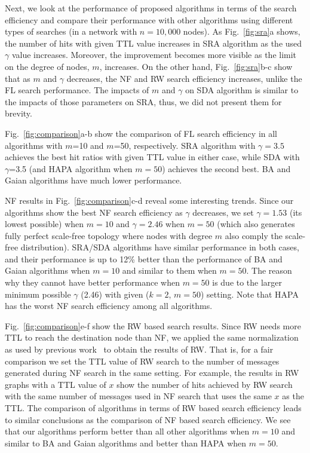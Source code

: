 \documentclass[10pt,journal,cspaper,compsoc]{IEEEtran}
\begin{document}
Next, we look at the performance of proposed algorithms in terms of the search efficiency and compare their performance with other algorithms using different types of searches (in a network with $n=10,000$ nodes). As Fig.~\ref{fig:sra}a shows, the number of hits with given TTL value increases in SRA algorithm as the used $\gamma$ value increases. Moreover, the improvement becomes more visible as the limit on the degree of nodes, $m$, increases. On the other hand, Fig.~\ref{fig:sra}b-c show that as $m$ and $\gamma$ decreases, the NF and RW search efficiency increases, unlike the FL search performance. The impacts of $m$ and $\gamma$ on SDA algorithm is similar to the impacts of those parameters on SRA, thus, we did not present them for brevity. 

Fig.~\ref{fig:comparison}a-b show the comparison of FL search efficiency in all algorithms with $m$=10 and $m$=50, respectively. SRA algorithm with $\gamma =3.5$ achieves the best hit ratios with given TTL value in either case, while SDA with $\gamma$=3.5 (and HAPA algorithm when $m=50$) achieves the second best. BA and Gaian algorithms have much lower performance. 



NF results in Fig.~\ref{fig:comparison}c-d reveal some interesting trends. Since our algorithms show the best NF search efficiency as $\gamma$ decreases, we set $\gamma=1.53$ (its lowest possible) when $m=10$ and $\gamma=2.46$ when $m=50$ (which also generates fully perfect scale-free topology where nodes with degree $m$ also comply the scale-free distribution). SRA/SDA algorithms have similar performance in both cases, and their performance is up to 12\% better than the performance of BA and Gaian algorithms when $m=10$ and similar to them when $m=50$. The reason why they cannot have better performance when $m=50$ is due to the larger minimum possible $\gamma$ (2.46) with given ($k=2$, $m=50$) setting. Note that HAPA has the worst NF search efficiency among all algorithms.
 




Fig.~\ref{fig:comparison}e-f show the RW based search results. Since RW needs more TTL to reach the destination node than NF, we applied the same normalization as used by previous work~\cite{guclu} to obtain the results of RW. That is, for a fair comparison we set the TTL value of RW search to the number of messages generated during NF search in the same setting. For example, the results in RW graphs with a TTL value of $x$ show the number of hits achieved by RW search with the same number of messages used in NF search that uses the same $x$ as the TTL. The comparison of algorithms in terms of RW based search efficiency leads to similar conclusions as the comparison of NF based search efficiency. We see that our algorithms perform better than all other algorithms when $m=10$ and similar to BA and Gaian algorithms and better than HAPA when $m=50$.
\end{document}
